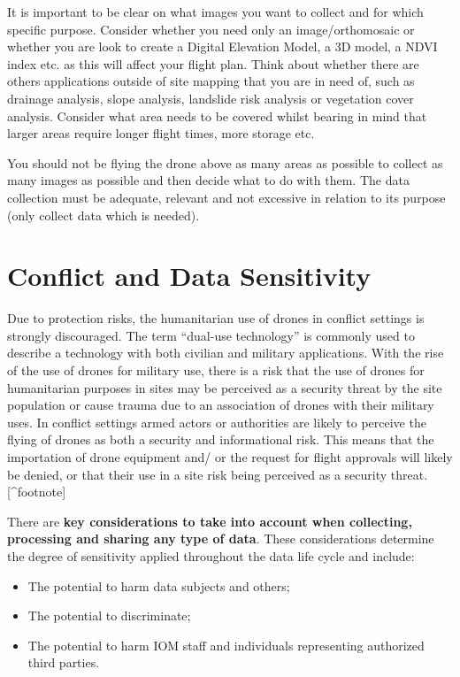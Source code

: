 \documentclass[
  a4paper,
  onecolumn,
  oneside]{book}
\providecommand{\tightlist}{%
  \setlength{\itemsep}{0pt}\setlength{\parskip}{0pt}}\usepackage{longtable,booktabs,array}
\begin{document}
It is important to be clear on what images you want to collect and for
which specific purpose. Consider whether you need only an
image/orthomosaic or whether you are look to create a Digital Elevation
Model, a 3D model, a NDVI index etc. as this will affect your flight
plan. Think about whether there are others applications outside of site
mapping that you are in need of, such as drainage analysis, slope
analysis, landslide risk analysis or vegetation cover analysis. Consider
what area needs to be covered whilst bearing in mind that larger areas
require longer flight times, more storage etc.

You should not be flying the drone above as many areas as possible to
collect as many images as possible and then decide what to do with them.
The data collection must be adequate, relevant and not excessive in
relation to its purpose (only collect data which is needed).

\hypertarget{conflict-and-data-sensitivity}{%
\section{Conflict and Data
Sensitivity}\label{conflict-and-data-sensitivity}}

Due to protection risks, the humanitarian use of drones in conflict
settings is strongly discouraged. The term ``dual-use technology'' is
commonly used to describe a technology with both civilian and military
applications. With the rise of the use of drones for military use, there
is a risk that the use of drones for humanitarian purposes in sites may
be perceived as a security threat by the site population or cause trauma
due to an association of drones with their military uses. In conflict
settings armed actors or authorities are likely to perceive the flying
of drones as both a security and informational risk. This means that the
importation of drone equipment and/ or the request for flight approvals
will likely be denied, or that their use in a site risk being perceived
as a security threat. {[}\^{}footnote{]}

There are \textbf{key considerations to take into account when
collecting, processing and sharing any type of data}. These
considerations determine the degree of sensitivity applied throughout
the data life cycle and include:

\begin{itemize}
\tightlist
\item
  The potential to harm data subjects and others;
\item
  The potential to discriminate;
\item
  The potential to harm IOM staff and individuals representing
  authorized third parties.
\end{itemize}
\end{document}
